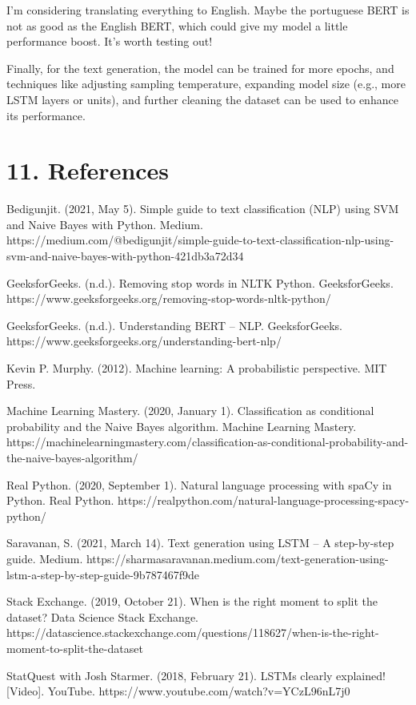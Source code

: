 \documentclass[11pt]{article}
\begin{document}
I'm considering translating everything to English. Maybe the portuguese
BERT is not as good as the English BERT, which could give my model a
little performance boost. It's worth testing out!

Finally, for the text generation, the model can be trained for more
epochs, and techniques like adjusting sampling temperature, expanding
model size (e.g., more LSTM layers or units), and further cleaning the
dataset can be used to enhance its performance.

    \section{11. References}\label{references}

    Bedigunjit. (2021, May 5). Simple guide to text classification (NLP)
using SVM and Naive Bayes with Python. Medium.
https://medium.com/@bedigunjit/simple-guide-to-text-classification-nlp-using-svm-and-naive-bayes-with-python-421db3a72d34

GeeksforGeeks. (n.d.). Removing stop words in NLTK Python.
GeeksforGeeks.
https://www.geeksforgeeks.org/removing-stop-words-nltk-python/

GeeksforGeeks. (n.d.). Understanding BERT -- NLP. GeeksforGeeks.
https://www.geeksforgeeks.org/understanding-bert-nlp/

Kevin P. Murphy. (2012). Machine learning: A probabilistic perspective.
MIT Press.

Machine Learning Mastery. (2020, January 1). Classification as
conditional probability and the Naive Bayes algorithm. Machine Learning
Mastery.
https://machinelearningmastery.com/classification-as-conditional-probability-and-the-naive-bayes-algorithm/

Real Python. (2020, September 1). Natural language processing with spaCy
in Python. Real Python.
https://realpython.com/natural-language-processing-spacy-python/

Saravanan, S. (2021, March 14). Text generation using LSTM -- A
step-by-step guide. Medium.
https://sharmasaravanan.medium.com/text-generation-using-lstm-a-step-by-step-guide-9b787467f9de

Stack Exchange. (2019, October 21). When is the right moment to split
the dataset? Data Science Stack Exchange.
https://datascience.stackexchange.com/questions/118627/when-is-the-right-moment-to-split-the-dataset

StatQuest with Josh Starmer. (2018, February 21). LSTMs clearly
explained! {[}Video{]}. YouTube.
https://www.youtube.com/watch?v=YCzL96nL7j0
\end{document}
